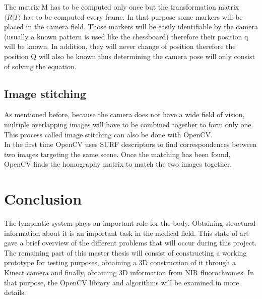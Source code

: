 The matrix M has to be computed only once but the transformation matrix $\langle R\vert T\rangle$ has to be computed every frame. In that purpose some markers will be placed in the camera field. Those markers will be easily identifiable by the camera (usually a known pattern is used like the chessboard) therefore their position q will be known. In addition, they will never change of position therefore the position Q will also be known thus determining the camera pose will only consist of solving the equation.

\subsection{Image stitching}

As mentioned before, because the camera does not have a wide field of vision, multiple overlapping images will have to be combined together to form only one. This process called image stitching can also be done with OpenCV.\\

In the first time OpenCV uses SURF descriptors \cite{bay_surf:_2006} to find correspondences between two images targeting the same scene. Once the matching has been found, OpenCV finds the homography matrix to match the two images together. 

\section{Conclusion}

The lymphatic system plays an important role for the body. Obtaining structural information about it is an important task in the medical field. This state of art gave a brief overview of the different problems that will occur during this project. The remaining part of this master thesis will consist of constructing a working prototype for testing purposes, obtaining a 3D construction of it through a Kinect camera and finally, obtaining 3D information from NIR fluorochromes. In that purpose, the OpenCV library and algorithms will be examined in more details.
